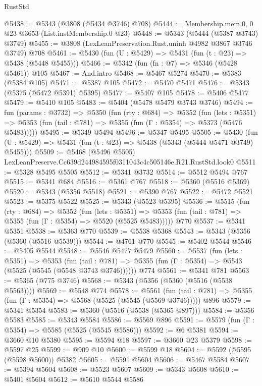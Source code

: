 \begin{lexlean}{RustStd}
\begin{coremodule}
@5438 := @5343 (@3808 (@5434 @3746) @708)
@5444 := Membership.mem.{0, 0} @23 @3653 (List.instMembership.{0} @23)
@5448 := @5343 (@5444 (@5387 @3743) @3749)
@5455 := @3808 (LexLeanPreservation.Rust.uninh @4982 @3867 @3746 @3749) @708
@5461 := @5430 (fun (U : @5429) => @5431 (fun (t : @23) => @5438 (@5448 @5455)))
@5466 := @5342 (fun (fn : @7) => @5346 (@5428 @5461)) @105
@5467 := And.intro
@5468 := @5467 @5274
@5470 := @5383 (@5384 @105)
@5471 := @5387 @105
@5472 := @5470 @5471
@5476 := @5343 (@5375 (@5472 @5391) @5395)
@5477 := @5407 @105
@5478 := @5406 @5477
@5479 := @5410 @105
@5483 := @5404 (@5478 @5479 @3743 @3746)
@5494 := fun (params : @3732) =>
  @5350
    (fun (rty : @684) =>
    @5352
      (fun (lets : @5351) =>
      @5353 (fun (tail : @781) => @5355 (fun (Γ : @5354) => @5373 (@5476 @5483)))))
@5495 := @5349 @5494
@5496 := @5347 @5495
@5505 := @5430 (fun (U : @5429) => @5431 (fun (t : @23) => @5438 (@5343 (@5444 @5471 @3749) @5455)))
@5509 := @5468 (@5496 @5505) LexLeanPreserve.Cc639d244984595f0311043c4c505146e.R21.RustStd.look0
@5511 := @5328 @5495 @5505
@5512 := @5341 @3732
@5514 := @5512 @5494 @767
@5515 := @5341 @684
@5516 := @5361 @767
@5518 := @5360 (@5516 @5369)
@5520 := @5343 (@5356 @5518)
@5521 := @5390 @767
@5522 := @5472 @5521
@5523 := @5375 @5522
@5525 := @5343 (@5523 @5395)
@5536 := @5515
    (fun (rty : @684) =>
    @5352
      (fun (lets : @5351) =>
      @5353 (fun (tail : @781) => @5355 (fun (Γ : @5354) => @5520 (@5525 @5483)))))
    @770
@5537 := @5341 @5351
@5538 := @5363 @770
@5539 := @5538 @5368
@5543 := @5343 (@5356 (@5360 (@5516 @5539)))
@5544 := @4761 @770
@5545 := @5402 @5544
@5546 := @5405 @5544
@5548 := @5546 @5477 @5479
@5560 := @5537
    (fun (lets : @5351) =>
    @5353
      (fun (tail : @781) => @5355 (fun (Γ : @5354) => @5543 (@5525 (@5545 (@5548 @3743 @3746))))))
    @774
@5561 := @5341 @781
@5563 := @5365 (@775 @3746)
@5568 := @5343 (@5356 (@5360 (@5516 (@5538 @5563))))
@5569 := @5548 @774
@5578 := @5561
    (fun (tail : @781) => @5355 (fun (Γ : @5354) => @5568 (@5525 (@5545 (@5569 @3746)))))
    @896
@5579 := @5341 @5354
@5583 := @5360 (@5516 (@5538 (@5365 @897)))
@5584 := @5356 @5583
@5585 := @5343 @5584
@5586 := @5569 @896
@5591 := @5579 (fun (Γ : @5354) => @5585 (@5525 (@5545 @5586)))
@5592 := @6 @5381
@5594 := @3660 @10 @5380
@5595 := @5594 @18
@5597 := @3660 @23 @5379
@5598 := @5597 @25
@5599 := @909 @10
@5600 := @5599 @18
@5604 := @5592 (@5595 (@5598 @5600)) @5382
@5605 := @5591 @5604
@5606 := @5467 @5584
@5607 := @5394 @5604
@5608 := @5523 @5607
@5609 := @5343 @5608
@5610 := @5401 @5604
@5612 := @5610 @5544 @5586

\end{coremodule}
\end{lexlean}
